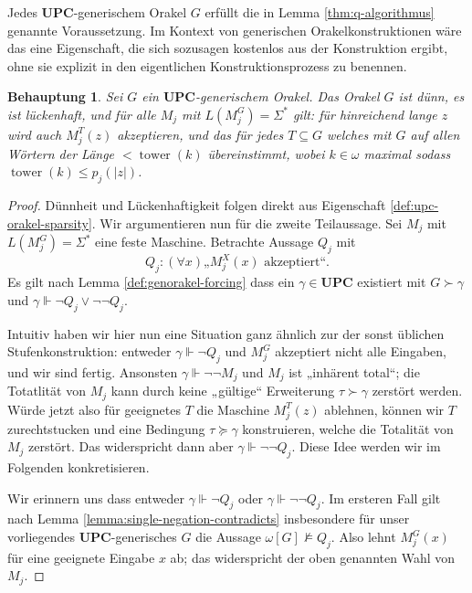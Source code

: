\documentclass[nofonts]{uebung}
\newtheorem{claim}[theorem]{Behauptung}
\theoremstyle{definition}
\DeclareMathOperator{\tower}{tower}
\begin{document}
Jedes $\mathbf{UPC}$-generischem Orakel $G$ erfüllt die in Lemma \ref{thm:q-algorithmus} genannte Voraussetzung.
Im Kontext von generischen Orakelkonstruktionen wäre das eine Eigenschaft, die sich sozusagen kostenlos aus der Konstruktion ergibt, ohne sie explizit in den eigentlichen Konstruktionsprozess zu benennen.
\begin{claim}\label{claim:upc-erfüllt-q-bedingungen}
    Sei $G$ ein $\mathbf{UPC}$-generischem Orakel.
    Das Orakel $G$ ist dünn, es ist lückenhaft, und für alle $M_j$ mit $L(M_j^G)=\Sigma^*$ gilt: für hinreichend lange $z$ wird auch $M_j^T(z)$ akzeptieren, und das für jedes $T\subseteq G$ welches mit $G$ auf allen Wörtern der Länge $<\tower(k)$ übereinstimmt, wobei $k\in\omega$ maximal sodass $\tower(k)\leq p_j(|z|)$.
\end{claim}
\begin{proof}
    Dünnheit und Lückenhaftigkeit folgen direkt aus Eigenschaft \ref{def:upc-orakel-sparsity}.
    Wir argumentieren nun für die zweite Teilaussage. Sei $M_j$ mit $L(M_j^G)=\Sigma^*$ eine feste Maschine.
    Betrachte Aussage $Q_j$ mit
    \[ Q_j: (\forall x)\text{„$M_j^X(x)$ akzeptiert“}. \]
    Es gilt nach Lemma \ref{def:genorakel-forcing} dass ein $\gamma\in \mathbf{UPC}$ existiert mit $G\succ \gamma$ und $\gamma\Vdash \neg Q_j\lor \neg\neg Q_j$.

    Intuitiv haben wir hier nun eine Situation ganz ähnlich zur der sonst üblichen Stufenkonstruktion: entweder $\gamma\Vdash\neg Q_j$ und $M_j^G$ akzeptiert nicht alle Eingaben, und wir sind fertig.
    Ansonsten $\gamma\Vdash\neg\neg M_j$ und $M_j$ ist „inhärent total“; die Totatlität von $M_j$ kann durch keine „gültige“ Erweiterung $\tau\succ \gamma$ zerstört werden. Würde jetzt also für geeignetes $T$ die Maschine $M_j^T(z)$ ablehnen, können wir $T$ zurechtstucken und eine Bedingung $\tau\succeq\gamma$ konstruieren, welche die Totalität von $M_j$ zerstört. Das widerspricht dann aber $\gamma\Vdash\neg\neg Q_j$.
    Diese Idee werden wir im Folgenden konkretisieren.



    Wir erinnern uns dass entweder $\gamma\Vdash\neg Q_j$ oder $\gamma\Vdash\neg\neg Q_j$.
    Im ersteren Fall gilt nach Lemma \ref{lemma:single-negation-contradicts} insbesondere für unser vorliegendes $\mathbf{UPC}$-generisches $G$ die Aussage $\omega[G] \not\vDash Q_j$.
    Also lehnt $M_j^G(x)$ für eine geeignete Eingabe $x$ ab; das widerspricht der oben genannten Wahl von $M_j$.


\end{proof}
\end{document}
